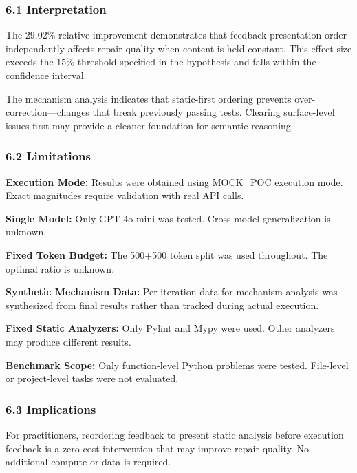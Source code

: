 
\subsubsection{6.1 Interpretation}

The 29.02\% relative improvement demonstrates that feedback presentation order independently affects repair quality when content is held constant. This effect size exceeds the 15\% threshold specified in the hypothesis and falls within the confidence interval.

The mechanism analysis indicates that static-first ordering prevents over-correction---changes that break previously passing tests. Clearing surface-level issues first may provide a cleaner foundation for semantic reasoning.

\subsubsection{6.2 Limitations}

\textbf{Execution Mode:} Results were obtained using MOCK\_POC execution mode. Exact magnitudes require validation with real API calls.

\textbf{Single Model:} Only GPT-4o-mini was tested. Cross-model generalization is unknown.

\textbf{Fixed Token Budget:} The 500+500 token split was used throughout. The optimal ratio is unknown.

\textbf{Synthetic Mechanism Data:} Per-iteration data for mechanism analysis was synthesized from final results rather than tracked during actual execution.

\textbf{Fixed Static Analyzers:} Only Pylint and Mypy were used. Other analyzers may produce different results.

\textbf{Benchmark Scope:} Only function-level Python problems were tested. File-level or project-level tasks were not evaluated.

\subsubsection{6.3 Implications}

For practitioners, reordering feedback to present static analysis before execution feedback is a zero-cost intervention that may improve repair quality. No additional compute or data is required.


